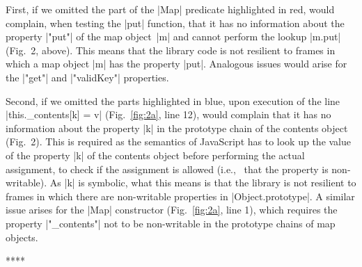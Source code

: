 \setcounter{figure}{2} 
First, if we omitted the part of the \jsinline|Map| predicate highlighted in red, \cosette would complain, when testing the \jsinline|put| function, that it has no information about the property \jsinline|"put"| of the map object~\jsinline|m| and cannot perform the lookup \jsinline|m.put| (Fig.~2, above). This means that the library code is not resilient to frames in which a map object \jsinline|m| has the property \jsinline|put|.
Analogous issues would arise for the \jsinline|"get"| and \jsinline|"validKey"| properties.%

Second, if we omitted the parts highlighted in blue, upon execution of
the line \jsinline|this._contents[k] = v| (Fig.~\ref{fig:2a}, line
12), \cosette would complain that it has no information about the property \jsinline|k| in the prototype chain of the contents object (Fig.~2). This is required as the semantics of JavaScript has to look up the value of the property \jsinline|k| of the contents object before performing the actual assignment, to check if the assignment is allowed (i.e.,~ that the property is non-writable). As \jsinline|k| is symbolic, what this means is that the library is not resilient to frames in which there are non-writable properties in \jsinline|Object.prototype|. A similar issue arises for the \jsinline|Map| constructor (Fig.~\ref{fig:2a}, line 1), which requires the property \jsinline|"_contents"| not to be non-writable in the prototype chains of map objects.

****

